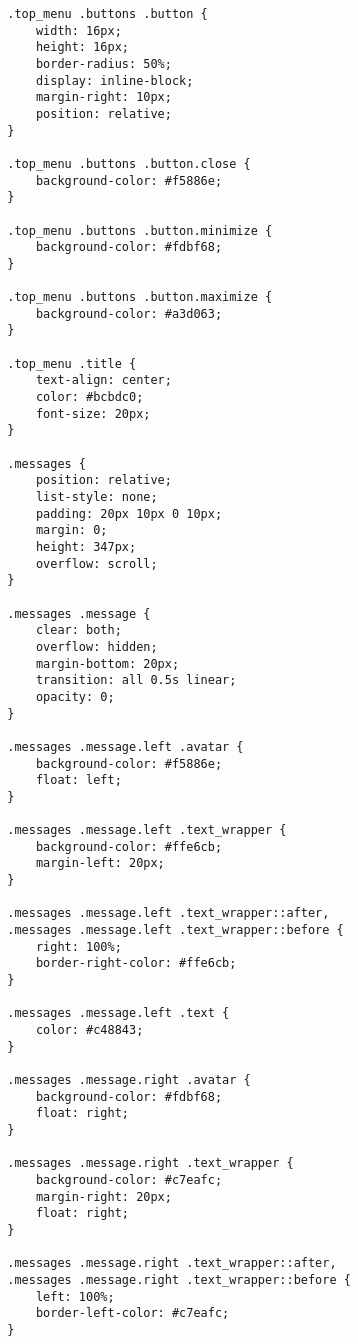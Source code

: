 \begin{verbatim}
        .top_menu .buttons .button {
            width: 16px;
            height: 16px;
            border-radius: 50%;
            display: inline-block;
            margin-right: 10px;
            position: relative;
        }
        
        .top_menu .buttons .button.close {
            background-color: #f5886e;
        }
        
        .top_menu .buttons .button.minimize {
            background-color: #fdbf68;
        }
        
        .top_menu .buttons .button.maximize {
            background-color: #a3d063;
        }
        
        .top_menu .title {
            text-align: center;
            color: #bcbdc0;
            font-size: 20px;
        }
        
        .messages {
            position: relative;
            list-style: none;
            padding: 20px 10px 0 10px;
            margin: 0;
            height: 347px;
            overflow: scroll;
        }
        
        .messages .message {
            clear: both;
            overflow: hidden;
            margin-bottom: 20px;
            transition: all 0.5s linear;
            opacity: 0;
        }
        
        .messages .message.left .avatar {
            background-color: #f5886e;
            float: left;
        }
        
        .messages .message.left .text_wrapper {
            background-color: #ffe6cb;
            margin-left: 20px;
        }
        
        .messages .message.left .text_wrapper::after,
        .messages .message.left .text_wrapper::before {
            right: 100%;
            border-right-color: #ffe6cb;
        }
        
        .messages .message.left .text {
            color: #c48843;
        }
        
        .messages .message.right .avatar {
            background-color: #fdbf68;
            float: right;
        }
        
        .messages .message.right .text_wrapper {
            background-color: #c7eafc;
            margin-right: 20px;
            float: right;
        }
        
        .messages .message.right .text_wrapper::after,
        .messages .message.right .text_wrapper::before {
            left: 100%;
            border-left-color: #c7eafc;
        }
        

\end{verbatim}
